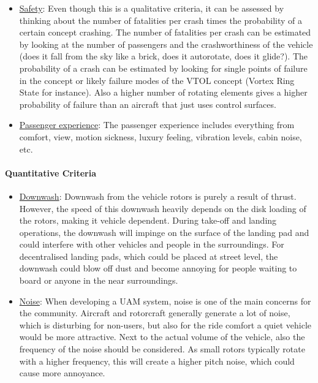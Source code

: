 \begin{itemize}[nolistsep]
    \item \underline{Safety}: Even though this is a qualitative criteria, it can be assessed by thinking about the number of fatalities per crash times the probability of a certain concept crashing. The number of fatalities per crash can be estimated by looking at the number of passengers and the crashworthiness of the vehicle (does it fall from the sky like a brick, does it autorotate, does it glide?). The probability of a crash can be estimated by looking for single points of failure in the concept or likely failure modes of the VTOL concept (Vortex Ring State for instance). Also a higher number of rotating elements gives a higher probability of failure than an aircraft that just uses control surfaces. 
    \item \underline{Passenger experience}: The passenger experience includes everything from comfort, view, motion sickness, luxury feeling, vibration levels, cabin noise, etc.
\end{itemize}

\paragraph{Quantitative Criteria}

\begin{itemize}[nolistsep]
    \item \underline{Downwash}: Downwash from the vehicle rotors is purely a result of thrust. However, the speed of this downwash heavily depends on the disk loading of the rotors, making it vehicle dependent. During take-off and landing operations, the downwash will impinge on the surface of the landing pad and could interfere with other vehicles and people in the surroundings. For decentralised landing pads, which could be placed at street level, the downwash could blow off dust and become annoying for people waiting to board or anyone in the near surroundings. 
    
    \item \underline{Noise}: When developing a UAM system, noise is one of the main concerns for the community. Aircraft and rotorcraft generally generate a lot of noise, which is disturbing for non-users, but also for the ride comfort a quiet vehicle would be more attractive. Next to the actual volume of the vehicle, also the frequency of the noise should be considered. As small rotors typically rotate with a higher frequency, this will create a higher pitch noise, which could cause more annoyance. 
    
\end{itemize}




